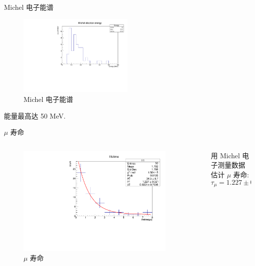\documentclass[10pt]{beamer}
\begin{document}
\begin{frame}[label={sec:org10c2e4d}]{Michel 电子能谱}
\begin{figure}[htbp]
\centering
\includegraphics[width=0.5\textwidth]{../../mu/michel/michel.pdf}
\caption{Michel 电子能谱}
\end{figure}
能量最高达 50 MeV.
\end{frame}

\begin{frame}[label={sec:orgeaa717b}]{\(\mu\) 寿命}
\begin{columns}
\begin{column}{0.5\columnwidth}
\begin{figure}[htbp]
\centering
\includegraphics[width=0.9\textwidth]{../../img/lifeHist.pdf}
\caption{\(\mu\) 寿命}
\end{figure}
\end{column}
\begin{column}{0.5\columnwidth}
用 Michel 电子测量数据估计 \(\mu\) 寿命:
\[\tau_{\mu} = 1.227 \pm \qty{0.321}{\mu s}.\]
\end{column}
\end{columns}
\end{frame}
\end{document}
